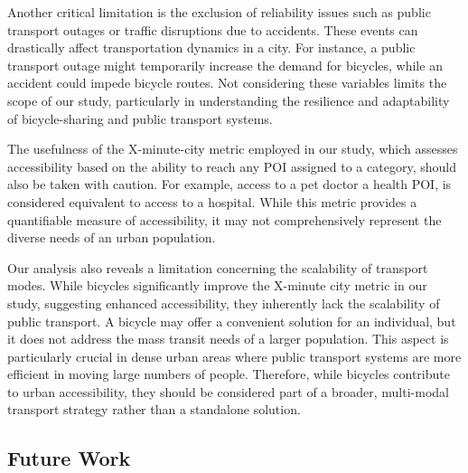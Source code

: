 Another critical limitation is the exclusion of reliability issues such as public transport outages or traffic disruptions due to accidents. 
These events can drastically affect transportation dynamics in a city. 
For instance, a public transport outage might temporarily increase the demand for bicycles, while an accident could impede bicycle routes. 
Not considering these variables limits the scope of our study, particularly in understanding the resilience and adaptability of bicycle-sharing and public transport systems.

The usefulness of the X-minute-city metric employed in our study, which assesses accessibility based on the ability to reach any POI assigned to a category, should also be taken with caution.
For example, access to a pet doctor a health POI, is considered equivalent to access to a hospital.
While this metric provides a quantifiable measure of accessibility, it may not comprehensively represent the diverse needs of an urban population. 

Our analysis also reveals a limitation concerning the scalability of transport modes. 
While bicycles significantly improve the X-minute city metric in our study, suggesting enhanced accessibility, they inherently lack the scalability of public transport. 
A bicycle may offer a convenient solution for an individual, but it does not address the mass transit needs of a larger population. 
This aspect is particularly crucial in dense urban areas where public transport systems are more efficient in moving large numbers of people. 
Therefore, while bicycles contribute to urban accessibility, they should be considered part of a broader, multi-modal transport strategy rather than a standalone solution.


\subsection{Future Work}
\label{sec:future_work}

